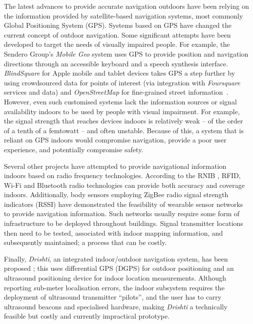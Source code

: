 The latest advances to provide accurate navigation outdoors have been relying on the information provided by satellite-based navigation systems, most commonly Global Positioning System (GPS). Systems based on GPS have changed the current concept of outdoor navigation. Some significant attempts have been developed to target the needs of visually impaired people. For example, the Sendero Group's {\it Mobile Geo} \citep{senderoSeeingEye} system uses GPS to provide position and navigation directions through an accessible keyboard and a speech synthesis interface. {\it BlindSquare} for Apple mobile and tablet devices takes GPS a step further by using crowdsourced data for points of interest (via integration with {\it Foursquare} services and data) and {\it OpenStreetMap} for fine-grained street information~\citep{blindSquare}. However, even such customised systems lack the information sources or signal availability indoors to be used by people with visual impairment. For example, the signal strength that reaches devices indoors is relatively weak -- of the order of a tenth of a femtowatt \citep{warner2003gps} -- and often unstable.  Because of this, a system that is reliant on GPS indoors would compromise navigation, provide a poor user experience, and potentially compromise safety.

Several other projects have attempted to provide navigational information indoors based on radio frequency technologies. According to the RNIB \citep{Worsfold2010}, RFID, Wi-Fi and Bluetooth radio technologies can provide both accuracy and coverage indoors. Additionally, body sensors employing ZigBee radio signal strength indicators (RSSI) \citep{dong2012mapping} have demonstrated the feasibility of wearable sensor networks to provide navigation information. Such networks usually require some form of infrastructure to be deployed throughout buildings. Signal transmitter locations then need to be tested, associated with indoor mapping information, and subsequently maintained; a process that can be costly.

Finally, {\it Drishti}, an integrated indoor/outdoor navigation system, has been proposed \citep{ran2004drishti}; this uses differential GPS (DGPS) for outdoor positioning and an ultrasound positioning device for indoor location measurements. Although reporting sub-meter localisation errors, the indoor subsystem requires the deployment of ultrasound transmitter ``pilots'', and the user has to carry ultrasound beacons and specialised hardware, making {\it Drishti} a technically feasible but costly and currently impractical prototype.

